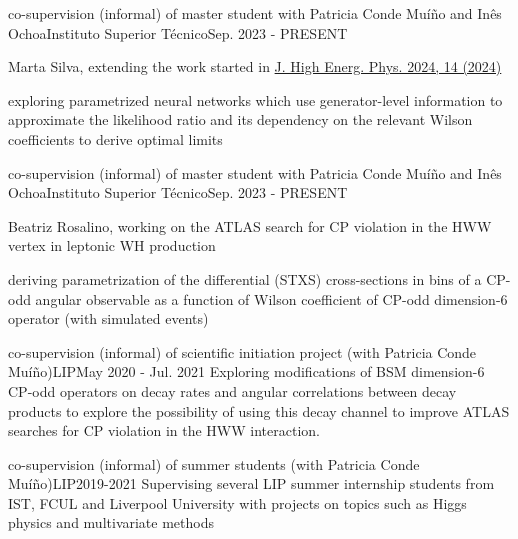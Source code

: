 
\begin{cventries}
    {co-supervision (informal) of master student with Patricia Conde Muíño and Inês Ochoa}{Instituto Superior Técnico}{Sep. 2023 - PRESENT}
    {
        \begin{cvitems}
            \item {Marta Silva, extending the work started in \href{https://doi.org/10.1007/JHEP04(2024)014}{J. High Energ. Phys. 2024, 14 (2024)}}
            \item {exploring parametrized neural networks which use generator-level information to approximate the likelihood ratio and its dependency on the relevant Wilson coefficients to derive optimal limits}
        \end{cvitems}
    }\vspace*{2mm}

    {co-supervision (informal) of master student with Patricia Conde Muíño and Inês Ochoa}{Instituto Superior Técnico}{Sep. 2023 - PRESENT}
    {
        \begin{cvitems}
            \item {Beatriz Rosalino, working on the ATLAS search for CP violation in the HWW vertex in leptonic WH production}
            \item {deriving parametrization of the differential (STXS) cross-sections in bins of a CP-odd angular observable as a function of Wilson coefficient of CP-odd dimension-6 operator (with simulated events)}
        \end{cvitems}
    }
    
    {co-supervision (informal) of scientific initiation project (with Patricia Conde Muíño)}{LIP}{May 2020 - Jul. 2021}
    {
        Exploring modifications of BSM dimension-6 CP-odd operators on decay rates and angular correlations between decay products to explore the possibility of using this decay channel to improve ATLAS searches for CP violation in the HWW interaction.
    }

    {co-supervision (informal) of summer students (with Patricia Conde Muíño)}{LIP}{2019-2021}
    {Supervising several LIP summer internship students from IST, FCUL and Liverpool University with projects on topics such as Higgs physics and multivariate methods}

\end{cventries}